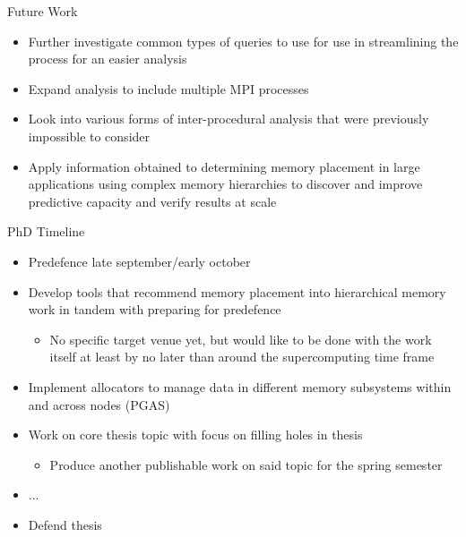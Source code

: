 \documentclass[final]{beamer}
\let\olditem\item
\renewcommand{\item}{\vspace{\fill}\olditem}
\begin{document}
\begin{frame}{\hspace{0.02\paperwidth}Future Work}
\begin{itemize}
\item Further investigate common types of queries to use for use in streamlining the process for an easier analysis
\item Expand analysis to include multiple \acs{MPI} processes
\item Look into various forms of inter-procedural analysis that were previously impossible to consider
\item Apply information obtained to determining memory placement in large applications using complex memory hierarchies to discover and improve predictive capacity and verify results at scale
\end{itemize}
\end{frame}

\begin{frame}{\hspace{0.02\paperwidth}PhD Timeline}
\begin{itemize}
\item Predefence late september/early october
\item Develop tools that recommend memory placement into hierarchical memory work in tandem with preparing for predefence
\begin{itemize}
\item No specific target venue yet, but would like to be done with the work itself at least by no later than around the supercomputing time frame
\end{itemize}
\item Implement allocators to manage data in different memory subsystems within and across nodes (\acs{PGAS})
\item Work on core thesis topic with focus on filling holes in thesis
\begin{itemize}
\item Produce another publishable work on said topic for the spring semester
\end{itemize}
\item ...
\item Defend thesis
\end{itemize}
\end{frame}
\end{document}
